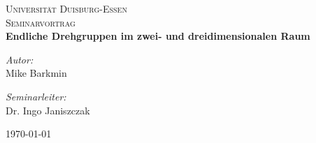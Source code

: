 
\begin{titlepage}
\begin{center}


\textsc{\LARGE Universität Duisburg-Essen}\\[1.5cm]

\textsc{\Large Seminarvortrag}\\[0.5cm]

{ \huge \bfseries Endliche Drehgruppen im zwei- und dreidimensionalen Raum \\[0.4cm] }

\begin{minipage}{0.4\textwidth}
\begin{flushleft} \large
\emph{Autor:}\\
Mike Barkmin
\end{flushleft}
\end{minipage}
\begin{minipage}{0.4\textwidth}
\begin{flushright} \large
\emph{Seminarleiter:} \\
Dr. Ingo Janiszczak
\end{flushright}
\end{minipage}

\vfill

{\large \today}
\end{center}
\end{titlepage}
